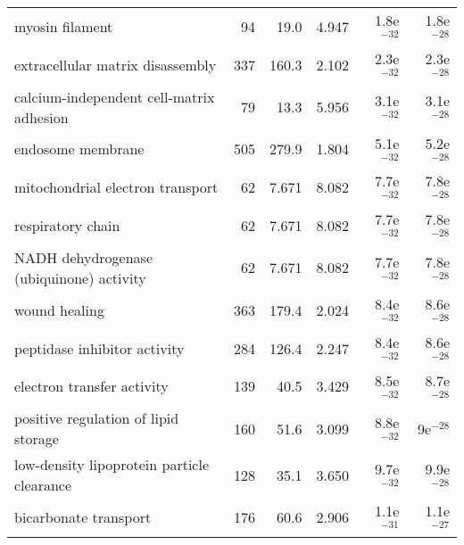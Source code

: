 \begin{longtable}{lrrrrr}
                                   myosin filament &                      94 &                    19.0 &      4.947 &         1.8e$^{-32}$ &         1.8e$^{-28}$ \\
                  extracellular matrix disassembly &                     337 &                   160.3 &      2.102 &         2.3e$^{-32}$ &         2.3e$^{-28}$ \\
          calcium-independent cell-matrix adhesion &                      79 &                    13.3 &      5.956 &         3.1e$^{-32}$ &         3.1e$^{-28}$ \\
                                 endosome membrane &                     505 &                   279.9 &      1.804 &         5.1e$^{-32}$ &         5.2e$^{-28}$ \\
                  mitochondrial electron transport &                      62 &                   7.671 &      8.082 &         7.7e$^{-32}$ &         7.8e$^{-28}$ \\
                                 respiratory chain &                      62 &                   7.671 &      8.082 &         7.7e$^{-32}$ &         7.8e$^{-28}$ \\
          NADH dehydrogenase (ubiquinone) activity &                      62 &                   7.671 &      8.082 &         7.7e$^{-32}$ &         7.8e$^{-28}$ \\
                                     wound healing &                     363 &                   179.4 &      2.024 &         8.4e$^{-32}$ &         8.6e$^{-28}$ \\
                      peptidase inhibitor activity &                     284 &                   126.4 &      2.247 &         8.4e$^{-32}$ &         8.6e$^{-28}$ \\
                        electron transfer activity &                     139 &                    40.5 &      3.429 &         8.5e$^{-32}$ &         8.7e$^{-28}$ \\
              positive regulation of lipid storage &                     160 &                    51.6 &      3.099 &         8.8e$^{-32}$ &           9e$^{-28}$ \\
        low-density lipoprotein particle clearance &                     128 &                    35.1 &      3.650 &         9.7e$^{-32}$ &         9.9e$^{-28}$ \\
                             bicarbonate transport &                     176 &                    60.6 &      2.906 &         1.1e$^{-31}$ &         1.1e$^{-27}$ \\

\end{longtable}

